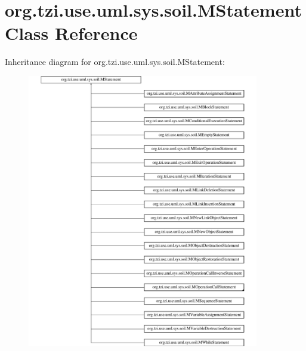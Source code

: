 \hypertarget{classorg_1_1tzi_1_1use_1_1uml_1_1sys_1_1soil_1_1_m_statement}{\section{org.\-tzi.\-use.\-uml.\-sys.\-soil.\-M\-Statement Class Reference}
\label{classorg_1_1tzi_1_1use_1_1uml_1_1sys_1_1soil_1_1_m_statement}
}
Inheritance diagram for org.\-tzi.\-use.\-uml.\-sys.\-soil.\-M\-Statement\-:\begin{figure}[H]
\begin{center}
\leavevmode
\includegraphics[height=12.000000cm]{classorg_1_1tzi_1_1use_1_1uml_1_1sys_1_1soil_1_1_m_statement}
\end{center}
\end{figure}
